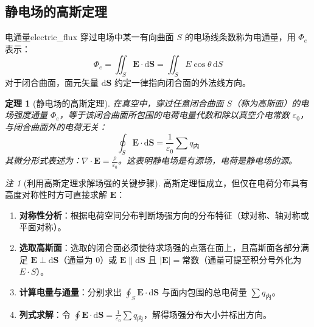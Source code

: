 \documentclass[11pt,a4paper,fontset=fandol]{ctexart}
\newtheorem{theorem}{定理}[section]
\theoremstyle{remark}
\newtheorem{remark}{注}[section]
\begin{document}
\subsection{静电场的高斯定理}

\begin{definition}{电通量}{electric_flux}
穿过电场中某一有向曲面 $S$ 的电场线条数称为电通量，用 $\Phi_e$ 表示：
\begin{equation}
    \Phi_e = \iint_S \bm{E} \cdot \mathrm{d}\bm{S} = \iint_S E \cos\theta\,\mathrm{d}S
\end{equation}
对于闭合曲面，面元矢量 $\mathrm{d}\bm{S}$ 约定一律指向闭合面的外法线方向。
\end{definition}

\begin{theorem}[静电场的高斯定理]
在真空中，穿过任意闭合曲面 $S$（称为高斯面）的电场强度通量 $\Phi_e$，等于该闭合曲面所包围的电荷电量代数和除以真空介电常数 $\varepsilon_0$，与闭合曲面外的电荷无关：
\begin{equation}
    \oint_S \bm{E} \cdot \mathrm{d}\bm{S} = \frac{1}{\varepsilon_0}\sum q_{\text{内}}
\end{equation}
其微分形式表述为：$\nabla \cdot \bm{E} = \frac{\rho}{\varepsilon_0}$。这表明静电场是有源场，电荷是静电场的源。
\end{theorem}

\begin{remark}[利用高斯定理求解场强的关键步骤]
高斯定理恒成立，但仅在电荷分布具有高度对称性时方可直接求解 $\bm{E}$：
\begin{enumerate}
    \item \textbf{对称性分析}：根据电荷空间分布判断场强方向的分布特征（球对称、轴对称或平面对称）。
    \item \textbf{选取高斯面}：选取的闭合面必须使待求场强的点落在面上，且高斯面各部分满足 $\bm{E} \perp \mathrm{d}\bm{S}$（通量为 0）或 $\bm{E} \parallel \mathrm{d}\bm{S}$ 且 $|\bm{E}| = \text{常数}$（通量可提至积分号外化为 $E \cdot S$）。
    \item \textbf{计算电量与通量}：分别求出 $\oint_S \bm{E}\cdot\mathrm{d}\bm{S}$ 与面内包围的总电荷量 $\sum q_{\text{内}}$。
    \item \textbf{列式求解}：令 $\oint \bm{E}\cdot\mathrm{d}\bm{S} = \frac{1}{\varepsilon_0}\sum q_{\text{内}}$，解得场强分布大小并标出方向。
\end{enumerate}
\end{remark}
\end{document}
